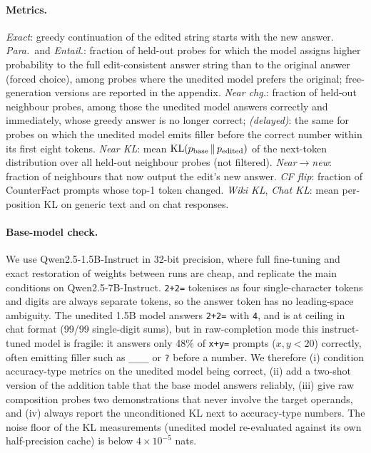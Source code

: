 \paragraph{Metrics.} \emph{Exact}: greedy continuation of the edited string starts with the new answer. \emph{Para.}\ and \emph{Entail.}: fraction of held-out probes for which the model assigns higher probability to the full edit-consistent answer string than to the original answer (forced choice), among probes where the unedited model prefers the original; free-generation versions are reported in the appendix. \emph{Near chg.}: fraction of held-out neighbour probes, among those the unedited model answers correctly and immediately, whose greedy answer is no longer correct; \emph{(delayed)}: the same for probes on which the unedited model emits filler before the correct number within its first eight tokens. \emph{Near KL}: mean $\mathrm{KL}(p_\text{base}\,\|\,p_\text{edited})$ of the next-token distribution over all held-out neighbour probes (not filtered). \emph{Near$\to$new}: fraction of neighbours that now output the edit's new answer. \emph{CF flip}: fraction of CounterFact prompts whose top-1 token changed. \emph{Wiki KL}, \emph{Chat KL}: mean per-position KL on generic text and on chat responses.

\paragraph{Base-model check.} We use Qwen2.5-1.5B-Instruct \citep{qwen25} in 32-bit precision, where full fine-tuning and exact restoration of weights between runs are cheap, and replicate the main conditions on Qwen2.5-7B-Instruct. \texttt{2+2=} tokenises as four single-character tokens and digits are always separate tokens, so the answer token has no leading-space ambiguity. The unedited 1.5B model answers \texttt{2+2=} with \texttt{4}, and is at ceiling in chat format (99/99 single-digit sums), but in raw-completion mode this instruct-tuned model is fragile: it answers only 48\% of \texttt{x+y=} prompts ($x,y<20$) correctly, often emitting filler such as \texttt{\_\_\_\_} or \texttt{?} before a number. We therefore (i) condition accuracy-type metrics on the unedited model being correct, (ii) add a two-shot version of the addition table that the base model answers reliably, (iii) give raw composition probes two demonstrations that never involve the target operands, and (iv) always report the unconditioned KL next to accuracy-type numbers. The noise floor of the KL measurements (unedited model re-evaluated against its own half-precision cache) is below $4\times10^{-5}$ nats.

